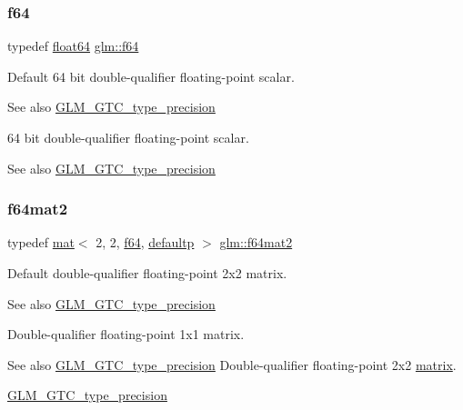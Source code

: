\subsubsection{\texorpdfstring{f64}{f64}}
{\footnotesize\ttfamily typedef \mbox{\hyperlink{group__gtc__type__precision_gab721f828b41f46b20cf4883b50733d3b}{float64}} \mbox{\hyperlink{group__gtc__type__precision_ga2bba392e555124b36cde6abba349bab3}{glm\+::f64}}}

Default 64 bit double-\/qualifier floating-\/point scalar. \begin{DoxySeeAlso}{See also}
\mbox{\hyperlink{group__gtc__type__precision}{G\+L\+M\+\_\+\+G\+T\+C\+\_\+type\+\_\+precision}}
\end{DoxySeeAlso}
64 bit double-\/qualifier floating-\/point scalar. \begin{DoxySeeAlso}{See also}
\mbox{\hyperlink{group__gtc__type__precision}{G\+L\+M\+\_\+\+G\+T\+C\+\_\+type\+\_\+precision}} 
\end{DoxySeeAlso}
\mbox{\label{group__gtc__type__precision_ga477d3143dab8df258829c0eaf3067770}} 
\subsubsection{\texorpdfstring{f64mat2}{f64mat2}}
{\footnotesize\ttfamily typedef \mbox{\hyperlink{structglm_1_1mat}{mat}}$<$ 2, 2, \mbox{\hyperlink{group__gtc__type__precision_ga2bba392e555124b36cde6abba349bab3}{f64}}, \mbox{\hyperlink{namespaceglm_a36ed105b07c7746804d7fdc7cc90ff25a9d21ccd8b5a009ec7eb7677befc3bf51}{defaultp}} $>$ \mbox{\hyperlink{group__gtc__type__precision_ga477d3143dab8df258829c0eaf3067770}{glm\+::f64mat2}}}

Default double-\/qualifier floating-\/point 2x2 matrix. \begin{DoxySeeAlso}{See also}
\mbox{\hyperlink{group__gtc__type__precision}{G\+L\+M\+\_\+\+G\+T\+C\+\_\+type\+\_\+precision}}
\end{DoxySeeAlso}
Double-\/qualifier floating-\/point 1x1 matrix. \begin{DoxySeeAlso}{See also}
\mbox{\hyperlink{group__gtc__type__precision}{G\+L\+M\+\_\+\+G\+T\+C\+\_\+type\+\_\+precision}} Double-\/qualifier floating-\/point 2x2 \mbox{\hyperlink{_s_d_l__opengl__glext_8h_a7b24a3f2f56eb1244ae69dacb4fecb6f}{matrix}}. 

\mbox{\hyperlink{group__gtc__type__precision}{G\+L\+M\+\_\+\+G\+T\+C\+\_\+type\+\_\+precision}} 
\end{DoxySeeAlso}
\mbox{\label{group__gtc__type__precision_gae18de078e2885803ceda215c6e04a08a}} 
